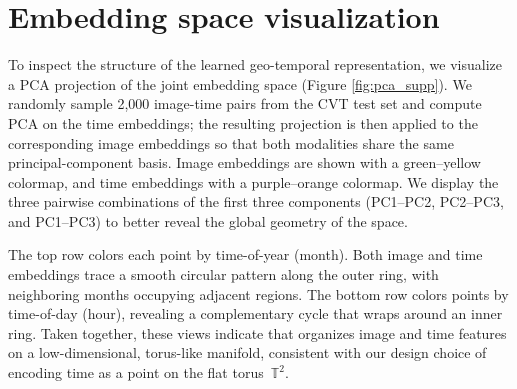 \section{Embedding space visualization}
\label{sup:embedding}

To inspect the structure of the learned geo-temporal representation, we visualize a PCA projection of the joint embedding space (Figure \ref{fig:pca_supp}). We randomly sample 2{,}000 image-time pairs from the CVT test set and compute PCA on the time embeddings; the resulting projection is then applied to the corresponding image embeddings so that both modalities share the same principal-component basis. Image embeddings are shown with a green--yellow colormap, and time embeddings with a purple--orange colormap. We display the three pairwise combinations of the first three components (PC1--PC2, PC2--PC3, and PC1--PC3) to better reveal the global geometry of the space.

The top row colors each point by time-of-year (month). Both image and time embeddings trace a smooth circular pattern along the outer ring, with neighboring months occupying adjacent regions. The bottom row colors points by time-of-day (hour), revealing a complementary cycle that wraps around an inner ring. Taken together, these views indicate that \tiger organizes image and time features on a low-dimensional, torus-like manifold, consistent with our design choice of encoding time as a point on the flat torus~$\mathbb{T}^2$.


